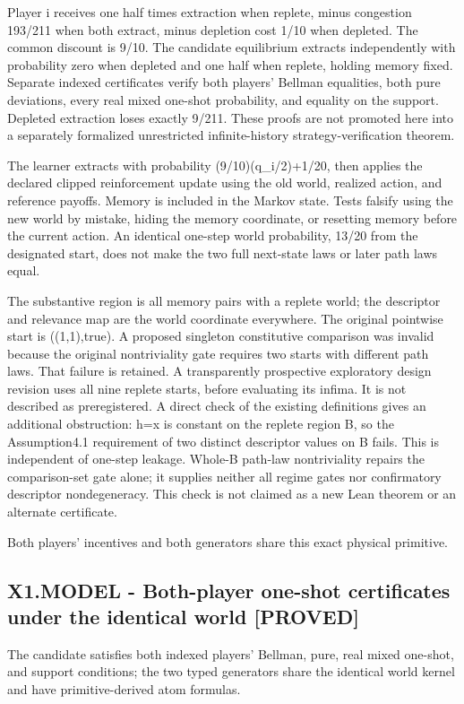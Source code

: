 \documentclass[11pt,a4paper]{article}
\newcommand{\companionEquation}[1]{\begin{center}\sbox{\companionEqBox}{$\displaystyle #1$}\ifdim\wd\companionEqBox>\linewidth\resizebox{\linewidth}{!}{\usebox{\companionEqBox}}\else\usebox{\companionEqBox}\fi\end{center}}
\begin{document}
Player i receives one half times extraction when replete, minus congestion 193/211 when both extract, minus depletion cost 1/10 when depleted. The common discount is 9/10. The candidate equilibrium extracts independently with probability zero when depleted and one half when replete, holding memory fixed. Separate indexed certificates verify both players' Bellman equalities, both pure deviations, every real mixed one-shot probability, and equality on the support. Depleted extraction loses exactly 9/211. These proofs are not promoted here into a separately formalized unrestricted infinite-history strategy-verification theorem.

The learner extracts with probability (9/10)(q\_i/2)+1/20, then applies the declared clipped reinforcement update using the old world, realized action, and reference payoffs. Memory is included in the Markov state. Tests falsify using the new world by mistake, hiding the memory coordinate, or resetting memory before the current action. An identical one-step world probability, 13/20 from the designated start, does not make the two full next-state laws or later path laws equal.

The substantive region is all memory pairs with a replete world; the descriptor and relevance map are the world coordinate everywhere. The original pointwise start is ((1,1),true). A proposed singleton constitutive comparison was invalid because the original nontriviality gate requires two starts with different path laws. That failure is retained. A transparently prospective exploratory design revision uses all nine replete starts, before evaluating its infima. It is not described as preregistered. A direct check of the existing definitions gives an additional obstruction: h=x is constant on the replete region B, so the Assumption4.1 requirement of two distinct descriptor values on B fails. This is independent of one-step leakage. Whole-B path-law nontriviality repairs the comparison-set gate alone; it supplies neither all regime gates nor confirmatory descriptor nondegeneracy. This check is not claimed as a new Lean theorem or an alternate certificate.

\companionEquation{p_{\rm rep}(x,a)=\min\{1,\max\{0,r_x-\frac{1}{4}(a_1+a_2)\}\},\quad V_i(0)=-\frac{121}{211},\quad V_i(1)=-\frac{81}{211}.}
{\small Both players' incentives and both generators share this exact physical primitive.}
\subsection*{X1.MODEL - Both-player one-shot certificates under the identical world [PROVED]}
The candidate satisfies both indexed players' Bellman, pure, real mixed one-shot, and support conditions; the two typed generators share the identical world kernel and have primitive-derived atom formulas.
\end{document}

